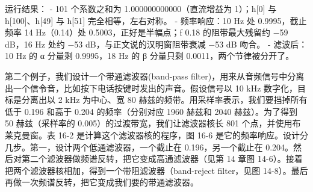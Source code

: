 \begin{Shaded}
\begin{Highlighting}[]
 \OperatorTok{(}  \OperatorTok{*}\OperatorTok{,}   \OperatorTok{*}\OperatorTok{,}  \OperatorTok{*}\OperatorTok{)}
\OperatorTok{\{}
     \OperatorTok{(}\OperatorTok{=}\OperatorTok{;}\OperatorTok{\textless{}}\OperatorTok{;}\OperatorTok{++)} \OperatorTok{\{}          
\OperatorTok{[}\OperatorTok{]} \OperatorTok{=} \OperatorTok{;}                         
         \OperatorTok{(}\OperatorTok{=} \OperatorTok{;}\OperatorTok{\textless{}=}\OperatorTok{;}\OperatorTok{++)}        
\OperatorTok{[}\OperatorTok{]} \OperatorTok{+=}\OperatorTok{[}\OperatorTok{{-}}\OperatorTok{]} \OperatorTok{*}\OperatorTok{[}\OperatorTok{];}        
    \OperatorTok{\}}
\OperatorTok{\}}
\end{Highlighting}
\end{Shaded}

运行结果： - 101 个系数之和为 1.000000000000（直流增益为 1）；h{[}0{]}
与 h{[}100{]}、h{[}49{]} 与 h{[}51{]} 完全相等，左右对称。 -
频率响应：10 Hz 处 0.9995，截止频率 14 Hz（0.14）处
0.5003，正好是半幅点；f  0.18 的阻带最大残留约 −59 dB，16 Hz
处约 −53 dB，与正文说的汉明窗阻带衰减 −53 dB 吻合。 - 滤波后：10 Hz 的 α
分量剩 0.9995，18 Hz 的 β 分量只剩 0.0011，两个节律被分开了。

第二个例子，我们设计一个带通滤波器(band-pass
filter)，用来从音频信号中分离出一个信令音，比如按下电话按键时发出的声音。假设信号以
10 kHz 数字化，目标是分离出以 2 kHz 为中心、宽 80
赫兹的频带。用采样率表示，我们要挡掉所有低于 0.196 和高于 0.204
的频率（分别对应 1960 赫兹和 2040 赫兹）。为了得到 50 赫兹（采样率的
0.005）的过渡带宽，我们让滤波器核长 801 个点，并使用布莱克曼窗。表 16-2
是计算这个滤波器核的程序，图 16-6
是它的频率响应。设计分几步。第一，设计两个低通滤波器，一个截止在
0.196，另一个截止在
0.204。然后对第二个滤波器做频谱反转，把它变成高通滤波器（见第 14 章图
14-6）。接着把两个滤波器核相加，得到一个带阻滤波器（band-reject
filter，见图 14-8）。最后再做一次频谱反转，把它变成我们要的带通滤波器。

